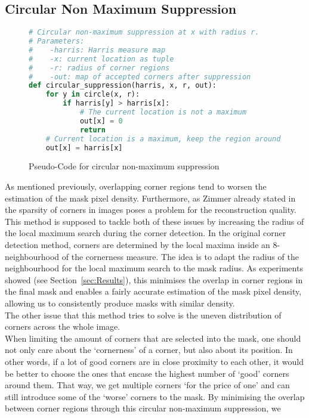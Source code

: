 \subsection{Circular Non Maximum Suppression}\label{sub:Suppression}
\begin{figure}[t]
    \begin{lstlisting}[language=Python]
# Circular non-maximum suppression at x with radius r.
# Parameters:
#    -harris: Harris measure map
#    -x: current location as tuple
#    -r: radius of corner regions
#    -out: map of accepted corners after suppression
def circular_suppression(harris, x, r, out):
    for y in circle(x, r):
        if harris[y] > harris[x]:
            # The current location is not a maximum
            out[x] = 0
            return
    # Current location is a maximum, keep the region around it
    out[x] = harris[x]
    \end{lstlisting}
    \caption{Pseudo-Code for circular non-maximum suppression}
\end{figure}
\noindent As mentioned previously, overlapping corner regions tend to worsen the estimation of the mask pixel
density. 
Furthermore, as Zimmer already stated in~\cite{zimmer07} the sparsity of corners in images poses a
problem for the reconstruction quality. This method is supposed to tackle both of these issues by
increasing the radius of the local maximum search during the corner detection. In the original
corner detection method, corners are determined by the local maxima inside an 
8-neighbourhood of the cornerness measure. The idea is to adapt the radius of the neighbourhood for the
local maximum search to the mask radius. As experiments showed (see Section~\ref{sec:Results}), this minimises the overlap in
corner regions in the final mask and enables a fairly accurate estimation of the mask pixel
density, allowing us to consistently produce masks with similar density. \\
The other issue that this method tries to solve is the uneven distribution of corners across
the whole image. \\
When limiting the amount of corners that are selected into the mask, one should not only care about
the `cornerness' of a corner, but also about its position. In other words, if a lot of good corners
are in close proximity to each other, it would be better to choose the ones that encase the 
highest number of `good' corners around them. 
That way, we get multiple corners `for the price of one' and can still introduce some 
of the `worse' corners to the mask.
By minimising the overlap between corner regions through this circular non-maximum suppression, we
